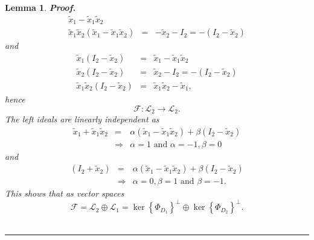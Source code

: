 \documentclass[aps,preprint]{revtex4}
\newtheorem{lemma}[theorem]{Lemma}
\newenvironment{proof}[1][Proof]{\noindent\textbf{#1.} }{\ \rule{0.5em}{0.5em}}
\begin{document}
\begin{lemma}
\begin{proof}
\begin{eqnarray}
\widetilde{x}_{1}-\widetilde{x}_{1}\widetilde{x}_{2} \\
\widetilde{x}_{1}\widetilde{x}_{2}\left( \widetilde{x}_{1}-\widetilde{x}_{1}%
\widetilde{x}_{2}\right) &=&-\widetilde{x}_{2}-I_{2}=-\left( I_{2}-%
\widetilde{x}_{2}\right)
\end{eqnarray}%
and%
\begin{eqnarray}
\widetilde{x}_{1}\left( I_{2}-\widetilde{x}_{2}\right) &=&\widetilde{x}_{1}-%
\widetilde{x}_{1}\widetilde{x}_{2} \\
\widetilde{x}_{2}\left( I_{2}-\widetilde{x}_{2}\right) &=&\widetilde{x}%
_{2}-I_{2}=-\left( I_{2}-\widetilde{x}_{2}\right) \\
\widetilde{x}_{1}\widetilde{x}_{2}\left( I_{2}-\widetilde{x}_{2}\right) &=&%
\widetilde{x}_{1}\widetilde{x}_{2}-\widetilde{x}_{1},
\end{eqnarray}%
hence 
\begin{equation}
\mathcal{F}:\mathcal{L}_{2}\rightarrow \mathcal{L}_{2}.
\end{equation}%
The left ideals are linearly independent as 
\begin{eqnarray}
\widetilde{x}_{1}+\widetilde{x}_{1}\widetilde{x}_{2} &=&\alpha \left( 
\widetilde{x}_{1}-\widetilde{x}_{1}\widetilde{x}_{2}\right) +\beta \left(
I_{2}-\widetilde{x}_{2}\right) \\
&\Rightarrow &\alpha =1\text{ and }\alpha =-1,\beta =0\text{ }
\end{eqnarray}%
and 
\begin{eqnarray}
\left( I_{2}+\widetilde{x}_{2}\right) &=&\alpha \left( \widetilde{x}_{1}-%
\widetilde{x}_{1}\widetilde{x}_{2}\right) +\beta \left( I_{2}-\widetilde{x}%
_{2}\right) \\
&\Rightarrow &\alpha =0,\beta =1\text{ and }\beta =-1.
\end{eqnarray}%
This shows that as vector spaces 
\begin{equation}
\mathcal{F}=\mathcal{L}_{2}\oplus \mathcal{L}_{1}=\ker \left\{ \Phi
_{D_{1}}\right\} ^{\bot }\oplus \ker \left\{ \Phi _{D_{2}}\right\} ^{\bot }.
\end{equation}
\end{proof}
\end{lemma}
\end{document}
